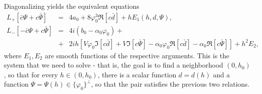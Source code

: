 \documentclass[12pt]{amsart}
\theoremstyle{definition}
\theoremstyle{remark}
\numberwithin{equation}{section}
\renewcommand{\(}{\left(}
\renewcommand{\)}{\right)}
\renewcommand{\[}{\left[}
\renewcommand{\]}{\right]}
\newcommand{\al}{\alpha}
\newcommand{\vp}{\varphi}
\begin{document}
 Diagonalizing yields the equivalent equations
  \begin{eqnarray}
  \label{315}
    L_+[\bar{c}\Psi+c\bar{\Psi}] &=&  4a_0 +8 \vp_0^3  \Re[c\bar{d}]+h E_1(h,d,\Psi),     \\
   \label{317}
 L_-[-\bar{c}\Psi+c\bar{\Psi}]  &=&    4i( b_0- \al_0 \vp_0) +
 \\
 \nonumber
 &+& 2 i h[ V\vp_0\Im[c\bar{d}]+V \Im[c\bar{\Psi}] - \al_0 \vp_0\Re[c \bar{d}]-\al_0 \Re[c\bar{\Psi}]]+ h^2 E_2,
  \end{eqnarray}
  where $E_1,E_2$ are smooth functions of the respective arguments.
 This is the system that we need to solve - that is, the goal is to find a neighborhood $(0,h_0)$, so that for every $h\in (0,h_0)$, there is a scalar function $d=d(h)$ and a function $\Psi=\Psi(h)\in \{\vp_0\}^\perp$, so that the pair satisfies the previous two relations.
\end{document}
